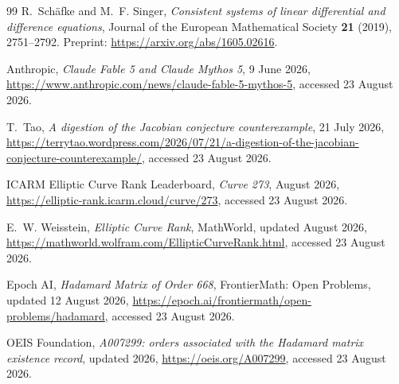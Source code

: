 \documentclass[11pt,oneside]{article}
\theoremstyle{definition}
\begin{document}
\begin{thebibliography}{99}
R.~Sch\"afke and M.~F. Singer,
\newblock \emph{Consistent systems of linear differential and difference equations},
\newblock Journal of the European Mathematical Society \textbf{21} (2019), 2751--2792.
\newblock Preprint: \url{https://arxiv.org/abs/1605.02616}.

Anthropic,
\newblock \emph{Claude Fable 5 and Claude Mythos 5}, 9 June 2026,
\newblock \url{https://www.anthropic.com/news/claude-fable-5-mythos-5}, accessed 23 August 2026.

T.~Tao,
\newblock \emph{A digestion of the Jacobian conjecture counterexample}, 21 July 2026,
\newblock \url{https://terrytao.wordpress.com/2026/07/21/a-digestion-of-the-jacobian-conjecture-counterexample/}, accessed 23 August 2026.

ICARM Elliptic Curve Rank Leaderboard,
\newblock \emph{Curve 273}, August 2026,
\newblock \url{https://elliptic-rank.icarm.cloud/curve/273}, accessed 23 August 2026.

E.~W. Weisstein,
\newblock \emph{Elliptic Curve Rank}, MathWorld, updated August 2026,
\newblock \url{https://mathworld.wolfram.com/EllipticCurveRank.html}, accessed 23 August 2026.

Epoch AI,
\newblock \emph{Hadamard Matrix of Order 668}, FrontierMath: Open Problems, updated 12 August 2026,
\newblock \url{https://epoch.ai/frontiermath/open-problems/hadamard}, accessed 23 August 2026.

OEIS Foundation,
\newblock \emph{A007299: orders associated with the Hadamard matrix existence record}, updated 2026,
\newblock \url{https://oeis.org/A007299}, accessed 23 August 2026.

\end{thebibliography}
\end{document}
